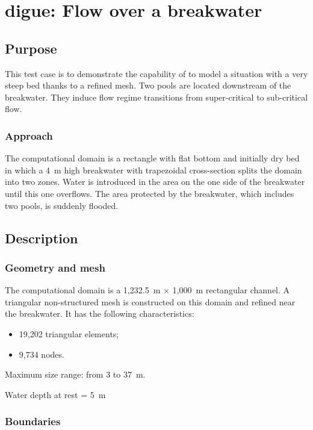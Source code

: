 \chapter{digue: Flow over a breakwater}

\section{Purpose}

This test case is to demonstrate the capability of 
to model a situation with a very steep bed thanks to a refined 
mesh.
Two pools are located downstream of the breakwater.
They induce flow regime transitions from super-critical to sub-critical flow.

\subsection{Approach}

The computational domain is a rectangle with flat bottom
and initially dry bed in which a 4~m high breakwater
with trapezoidal cross-section splits the domain into two zones.
Water is introduced in the area on the one side of the breakwater
until this one overflows.
The area protected by the breakwater, which includes 
two pools, is suddenly flooded.

\section{Description}

\subsection{Geometry and mesh}

The computational domain is a 1,232.5~m $\times$ 1,000~m rectangular channel.
A triangular non-structured mesh is constructed on this domain
and refined near the breakwater.
It has the following characteristics:
\begin{itemize}
\item 19,202 triangular elements;
\item 9,734 nodes.
\end{itemize}
Maximum size range: from 3 to 37~m.

Water depth at rest = 5~m

\subsection{Boundaries}

